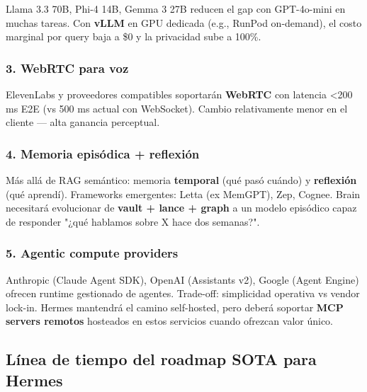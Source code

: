 \documentclass[11pt,a4paper]{article}
\begin{document}
Llama 3.3 70B, Phi-4 14B, Gemma 3 27B reducen el gap con GPT-4o-mini en muchas tareas. Con \textbf{vLLM} en GPU dedicada (e.g., RunPod on-demand), el costo marginal por query baja a \$0 y la privacidad sube a 100\%.

\subsubsection{3. WebRTC para voz}

ElevenLabs y proveedores compatibles soportarán \textbf{WebRTC} con latencia \textless 200 ms E2E (vs 500 ms actual con WebSocket). Cambio relativamente menor en el cliente — alta ganancia perceptual.

\subsubsection{4. Memoria episódica + reflexión}

Más allá de RAG semántico: memoria \textbf{temporal} (qué pasó cuándo) y \textbf{reflexión} (qué aprendí). Frameworks emergentes: Letta (ex MemGPT), Zep, Cognee. Brain necesitará evolucionar de \textbf{vault + lance + graph} a un modelo episódico capaz de responder "¿qué hablamos sobre X hace dos semanas?".

\subsubsection{5. Agentic compute providers}

Anthropic (Claude Agent SDK), OpenAI (Assistants v2), Google (Agent Engine) ofrecen runtime gestionado de agentes. Trade-off: simplicidad operativa vs vendor lock-in. Hermes mantendrá el camino self-hosted, pero deberá soportar \textbf{MCP servers remotos} hosteados en estos servicios cuando ofrezcan valor único.

\subsection{Línea de tiempo del roadmap SOTA para Hermes}
\end{document}
